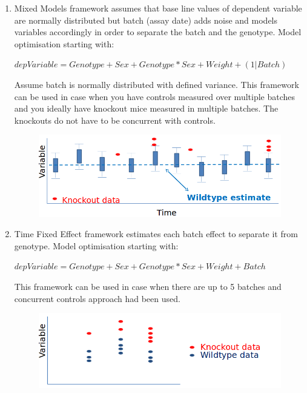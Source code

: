 \documentclass[12pt,a4paper]{article}
\begin{document}
\begin{enumerate}
\item Mixed Models framework assumes that base line values of dependent variable are normally distributed but batch (assay date) adds noise and models variables accordingly in order to separate the batch and the genotype. 
Model optimisation starting with:

$depVariable=Genotype+Sex+Genotype*Sex + Weight + (1|Batch)$

Assume batch is normally distributed with defined variance. This framework can be used in case when you have controls measured over multiple batches and you ideally have knockout mice measured in multiple batches. The knockouts do not have to be concurrent with controls.
\begin{figure}[H]%
\centerline{\includegraphics[scale=0.4]{MM_simple.png}}
\end{figure}

\item Time Fixed Effect framework estimates each batch effect to separate it from genotype.
Model optimisation starting with:

$depVariable=Genotype+Sex+Genotype*Sex + Weight + Batch$

This framework can be used in case when there are up to 5 batches and concurrent controls approach had been used. 
\begin{figure}[H]%
\centerline{\includegraphics[scale=0.4]{TFE_simple.png}}
\end{figure}


\end{enumerate}
\end{document}
